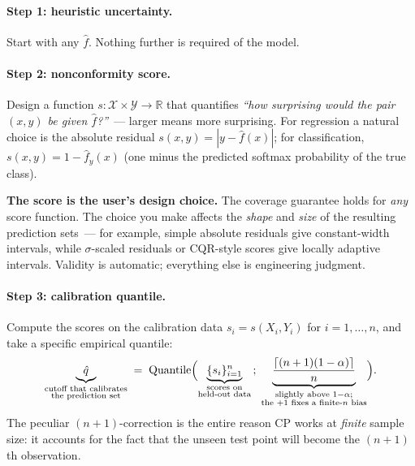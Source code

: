 \documentclass[letterpaper,11pt,leqno]{article}
\begin{document}
\paragraph{Step 1: heuristic uncertainty.} Start with any $\hat{f}$. Nothing further is required of the model.

\paragraph{Step 2: nonconformity score.} Design a function $s: \mathcal{X} \times \mathcal{Y} \to \mathbb{R}$ that quantifies \emph{``how surprising would the pair $(x, y)$ be given $\hat{f}$?''}~--- larger means more surprising. For regression a natural choice is the absolute residual $s(x, y) = |y - \hat{f}(x)|$; for classification, $s(x, y) = 1 - \hat{f}_y(x)$ (one minus the predicted softmax probability of the true class).

\begin{explain}
\textbf{The score is the user's design choice.} The coverage guarantee holds for \emph{any} score function. The choice you make affects the \emph{shape} and \emph{size} of the resulting prediction sets~--- for example, simple absolute residuals give constant-width intervals, while $\sigma$-scaled residuals or CQR-style scores give locally adaptive intervals. Validity is automatic; everything else is engineering judgment.
\end{explain}

\paragraph{Step 3: calibration quantile.} Compute the scores on the calibration data $s_i = s(X_i, Y_i)$ for $i = 1, \dots, n$, and take a specific empirical quantile:
\begin{equation*}
\underbrace{\hat{q}}_{\substack{\text{cutoff that calibrates}\\\text{the prediction set}}}
\;=\;
\text{Quantile}\Bigl(
\underbrace{\{s_i\}_{i=1}^{n}}_{\substack{\text{scores on}\\\text{held-out data}}}
\,;\;
\underbrace{\frac{\lceil (n+1)(1-\alpha) \rceil}{n}}_{\substack{\text{slightly above } 1-\alpha;\\\text{the }+1\text{ fixes a finite-}n\text{ bias}}}
\Bigr).
\end{equation*}
The peculiar $(n+1)$-correction is the entire reason CP works at \emph{finite} sample size: it accounts for the fact that the unseen test point will become the $(n+1)$th observation.
\end{document}
